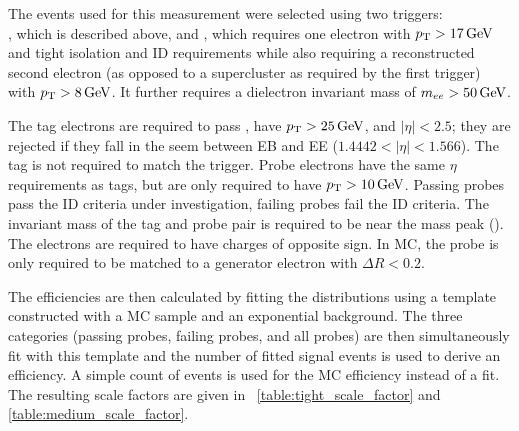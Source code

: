 The events used for this measurement were selected using two triggers: \\
\TnPTrigger, which is described above, and \TnPTriggerSecond, which requires
one electron with $p_{\mathrm{T}} > 17 \,\text{Ge\hspace{-.08em}V}$ and tight isolation and ID requirements while
also requiring a reconstructed second electron (as opposed to a supercluster as
required by the first trigger) with $p_{\mathrm{T}} > 8 \,\text{Ge\hspace{-.08em}V}$. It further requires a
dielectron invariant mass of $m_{ee} > 50 \,\text{Ge\hspace{-.08em}V}$.

The tag electrons are required to pass \EGTIGHT, have $p_{\mathrm{T}} > 25 \,\text{Ge\hspace{-.08em}V}$, and
$|\eta| < 2.5$; they are rejected if they fall in the seem between EB and EE
($1.4442 < |\eta| < 1.566$). The tag is not required to match the trigger.
Probe electrons have the same $\eta$ requirements as tags, but are only
required to have $p_{\mathrm{T}} > 10 \,\text{Ge\hspace{-.08em}V}$. Passing probes pass the ID criteria under
investigation, failing probes fail the ID criteria. The invariant mass of the
tag and probe pair is required to be near the \Z mass peak (\MassRange). The
electrons are required to have charges of opposite sign. In MC, the probe is
only required to be matched to a generator electron with $\Delta R < 0.2$.

The efficiencies are then calculated by fitting the \mee distributions using a
template constructed with a \Ztoee MC sample and an exponential background. The
three categories (passing probes, failing probes, and all probes) are then
simultaneously fit with this template and the number of fitted signal events is
used to derive an efficiency. A simple count of events is used for the MC
efficiency instead of a fit. The resulting scale factors are given in
\TABS~\ref{table:tight_scale_factor} and \ref{table:medium_scale_factor}.

